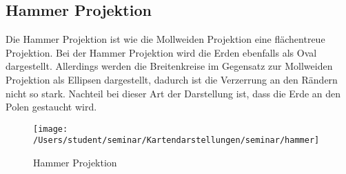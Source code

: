 \subsection{Hammer Projektion}
\label{sec:Hammer}
Die Hammer Projektion ist wie die Mollweiden Projektion eine flächentreue Projektion.
Bei der Hammer Projektion wird die Erden ebenfalls als Oval dargestellt. Allerdings werden die Breitenkreise im Gegensatz zur Mollweiden Projektion als Ellipsen dargestellt, dadurch ist die Verzerrung an den Rändern nicht so stark. Nachteil bei dieser Art der Darstellung ist, dass die Erde an den Polen gestaucht wird.\\

\begin{figure}[hbtp]
\centering
\texttt{[image: /Users/student/seminar/Kartendarstellungen/seminar/hammer]} \caption{Hammer Projektion}
\end{figure}
\newpage 